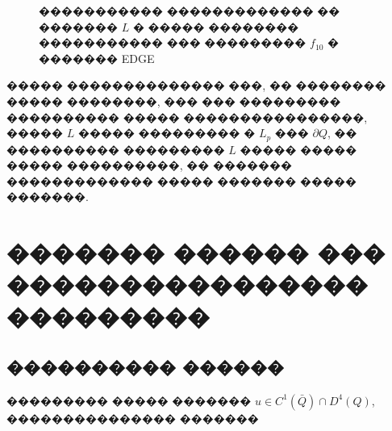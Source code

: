 \documentclass[a4paper]{article}
\begin{document}
\begin{figure}[h!]
  \noindent{}
  \caption{����������� ������������� �� ������� $L$ � ����� �������� ����������� ��� ��������� $f_{10}$ � ������� EDGE}
  \label{neustend}
\end{figure}

����� �������������� ���, �� �������� ����� ��������, ��� ��� ��������� ���������� ����� ����������������, ����� $L$ ����� ��������� � $L_p$ ��� $\partial Q$, �� ���������� ��������� $L$ ����� ����� ����� ����������, �� ������� ������������� ����� ������� ����� �������.

\newpage
\section{������� ������ ��� ���������������� ���������}

\subsection{���������� ������}
��������� ����� ������� $u \in C^1(\bar{Q}) \cap D^4(Q)$, ��������������� �������
\end{document}
